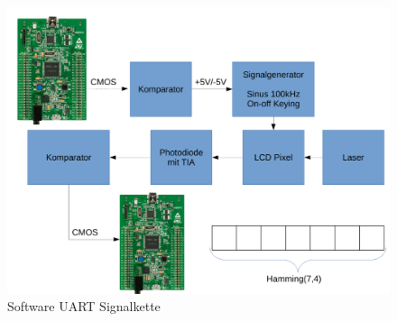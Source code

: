 \documentclass[12pt,a4paper]{article}
\begin{document}
\begin{figure}[H]
  \centering
  \includegraphics[width=\textwidth]{img/software_uart.pdf}
  \caption{Software UART Signalkette}
  \label{fig:sotware_uart_signal_chain}
\end{figure}
\end{document}
